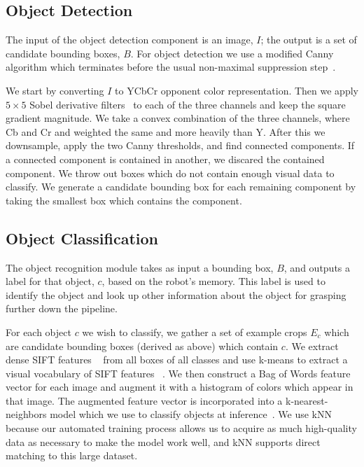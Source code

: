 \documentclass[graybox]{svmult}
\begin{document}
\subsection{Object Detection}
\label{sec:detection}

The input of the object detection component is an image, $I$; the
output is a set of candidate bounding boxes, $B$.  For object
detection we use a modified Canny algorithm which terminates before
the usual non-maximal suppression step~\citep{canny86}.


We start by converting $I$ to YCbCr opponent color representation.
Then we apply $5 \times 5$ Sobel derivative filters~\citep{sobel95} to
each of the three channels and keep the square gradient magnitude. We
take a convex combination of the three channels, where Cb and Cr and
weighted the same and more heavily than Y.  After this we downsample,
apply the two Canny thresholds, and find connected components.  If a
connected component is contained in another, we discared the contained
component.  We throw out boxes which do not contain enough visual data
to classify.  We generate a candidate bounding box for each remaining
component by taking the smallest box which contains the component.

\subsection{Object Classification}
\label{sec:recognition}

The object recognition module takes as input a bounding box, $B$, and
outputs a label for that object, $c$, based on the robot's memory.
This label is used to identify the object and look up other
information about the object for grasping further down the pipeline.

For each object $c$ we wish to classify, we gather a set of example
crops $E_c$ which are candidate bounding boxes (derived as above)
which contain $c$. We extract dense SIFT features ~\citep{lowe99} from
all boxes of all classes and use k-means to extract a visual
vocabulary of SIFT features ~\citep{szeliski10}. We then construct a
Bag of Words feature vector for each image and augment it with a histogram of
colors which appear in that image.  The augmented feature vector is
incorporated into a k-nearest-neighbors model which we use to classify
objects at inference~\citep{szeliski10}. We use kNN because our
automated training process allows us to acquire as much high-quality
data as necessary to make the model work well, and kNN supports direct
matching to this large dataset.  
\end{document}
